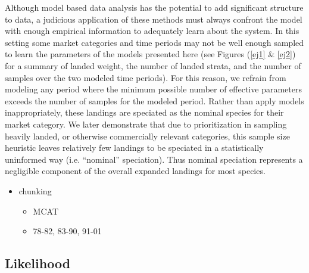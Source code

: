 \documentclass[12pt]{article}
\begin{document}
%
Although model based data analysis has the potential to add significant
structure to data, a judicious application of these methods must always
confront the model with enough empirical information to adequately learn
about the system. In this setting some market categories and time
periods may not be well enough sampled to learn the parameters of the
models presented here (see Figures (\ref{ej1} \& \ref{ej2}) for a summary of 
landed weight, the number of landed strata, and the number of samples over the 
two modeled time periods). For this reason, we refrain from modeling any 
period where the minimum possible number of effective parameters exceeds the 
number of samples for the modeled period. Rather than apply models 
inappropriately, these landings are speciated as the nominal species for their 
market category. We later demonstrate that due to prioritization in sampling 
heavily landed, or otherwise commercially relevant categories, this sample 
size heuristic leaves relatively few landings to be speciated in a 
statistically uninformed way (i.e. ``nominal'' speciation). Thus nominal 
speciation represents a negligible component of the overall expanded landings 
for most species.



{\color{red}
\begin{itemize}
\item chunking
	\begin{itemize}
	\item MCAT
	\item 78-82, 83-90, 91-01
	\end{itemize}
\end{itemize}
}

%
%
\subsection{Likelihood}
%
%
\end{document}
